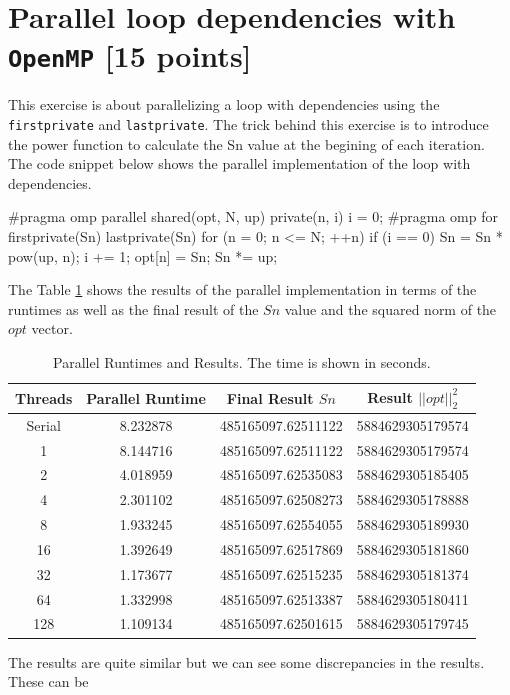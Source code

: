 \documentclass[unicode,11pt,a4paper,oneside,numbers=endperiod,openany]{scrartcl}
\begin{document}
\section{Parallel loop dependencies with \texttt{OpenMP} [15 points]}
This exercise is about parallelizing a loop with dependencies using the
\texttt{firstprivate} and \texttt{lastprivate}. The trick behind this exercise
is to introduce the power function to calculate the Sn value at the begining of
each iteration. The code snippet below shows the parallel implementation of the
loop with dependencies.
\begin{cppverbatim}
#pragma omp parallel shared(opt, N, up) private(n, i)
{
  i = 0;
#pragma omp for firstprivate(Sn) lastprivate(Sn)
  for (n = 0; n <= N; ++n)
  {
    if (i == 0)
    {
      Sn = Sn * pow(up, n);
      i += 1;
    }
    opt[n] = Sn;
    Sn *= up;
  }
}
\end{cppverbatim}
The Table \ref{tab:parallel-results} shows the results of the
parallel implementation in terms of the runtimes as well as the final result of
the $Sn$ value and the squared norm of the $opt$ vector.
\begin{table}[h]
    \centering
    \begin{tabular}{|c|c|c|c|}
    \hline
    Threads & Parallel Runtime & Final Result $Sn$ & Result $||opt||^2_2$ \\
    \hline
    Serial & 8.232878 & 485165097.62511122 & 5884629305179574 \\
    1 & 8.144716 & 485165097.62511122 & 5884629305179574 \\
    2 & 4.018959 & 485165097.62535083 & 5884629305185405 \\
    4 & 2.301102 & 485165097.62508273 & 5884629305178888 \\
    8 & 1.933245 & 485165097.62554055 & 5884629305189930 \\
    16 & 1.392649 & 485165097.62517869 & 5884629305181860 \\
    32 & 1.173677 & 485165097.62515235 & 5884629305181374 \\
    64 & 1.332998 & 485165097.62513387 & 5884629305180411 \\
    128 & 1.109134 & 485165097.62501615 & 5884629305179745 \\
    \hline
    \end{tabular}
    \caption{Parallel Runtimes and Results. The time is shown in seconds.}
    \label{tab:parallel-results}
\end{table}
The results are quite
similar but we can see some discrepancies in the results. These can be
\end{document}
